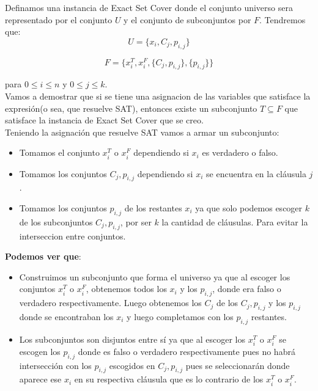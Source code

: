 \documentclass{article}
\begin{document}
Definamos una instancia de Exact Set Cover donde el conjunto universo sera representado por el conjunto \(U\) y el conjunto de subconjuntos por \(F\).
Tendremos que:
\[U = \{ x_i, C_j, p_{i,j}\}\]

\[F = \{x_{i}^{T}, x_{i}^{F}, \{C_j, p_{i,j}\}, \{p_{i,j}\}\}\]

para  $0 \leq i \leq n$ y  $0 \leq j \leq k$. \\

Vamos a demostrar que si se tiene una asignacion de las variables que satisface la expresión(o sea, que resuelve SAT), entonces existe un subconjunto $T \subseteq F$ que satisface la instancia de Exact Set Cover que se creo. \\

Teniendo la asignación que resuelve SAT vamos a armar un subconjunto:
\begin{itemize}
    \item Tomamos el conjunto $x_{i}^{T}$ o $x_{i}^{F}$ dependiendo si $x_i$ es verdadero o falso.
    \item Tomamos los conjuntos ${C_j, p_{i,j}}$ dependiendo si $x_i$ se encuentra en la cláusula $j$.
    \item Tomamos los conjuntos $p_{i,j}$ de los restantes $x_i$ ya que solo podemos escoger $k$ de los subconjuntos ${C_j, p_{i,j}}$, por ser $k$ la cantidad de cláusulas. Para evitar la interseccion entre conjuntos. \\
\end{itemize}

\textbf{Podemos ver que}:
\begin{itemize}
    \item Construimos un subconjunto que forma el universo ya que al escoger los conjuntos $x_{i}^{T}$ o $x_{i}^{F}$, obtenemos todos los $x_i$ y los $p_{i,j}$, donde era falso o verdadero respectivamente. Luego obtenemos los $C_j$ de los ${C_j, p_{i,j}}$ y los $p_{i,j}$ donde se encontraban los $x_i$ y luego completamos con los $p_{i,j}$ restantes.
    \item Los subconjuntos son disjuntos entre sí ya que al escoger los $x_{i}^{T}$ o $x_{i}^{F}$ se escogen los $p_{i,j}$ donde es falso o verdadero respectivamente pues no habrá intersección con los $p_{i,j}$ escogidos en ${C_j, p_{i,j}}$ pues se seleccionarán donde aparece ese $x_i$ en su respectiva cláusula que es lo contrario de los $x_{i}^{T}$ o $x_{i}^{F}$. \\
\end{itemize}
\end{document}
